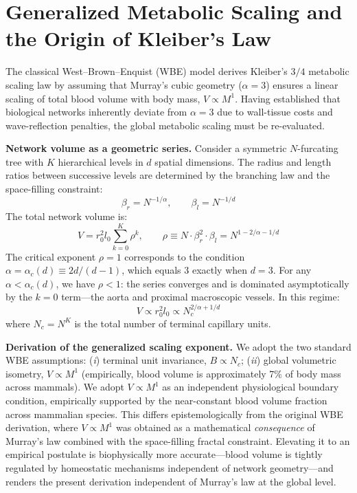 \documentclass[11pt,a4paper]{article}
\theoremstyle{remark}
\begin{document}
\section{Generalized Metabolic Scaling and the Origin of Kleiber's Law}

The classical West--Brown--Enquist (WBE) model derives Kleiber's $3/4$ metabolic
scaling law by assuming that Murray's cubic geometry ($\alpha=3$) ensures a
linear scaling of total blood volume with body mass, $V \propto M^1$. Having
established that biological networks inherently deviate from $\alpha=3$ due to
wall-tissue costs and wave-reflection penalties, the global metabolic scaling
must be re-evaluated.

\noindent\textbf{Network volume as a geometric series.} Consider a symmetric $N$-furcating tree with $K$ hierarchical levels in $d$ spatial dimensions. The radius and length ratios between successive levels are determined by the branching law and the space-filling constraint:
\begin{equation}
\beta_r = N^{-1/\alpha}, \qquad \beta_l = N^{-1/d}
\end{equation}
The total network volume is:
\begin{equation}
V = r_0^2 l_0 \sum_{k=0}^{K} \rho^k, \qquad \rho \equiv N \cdot \beta_r^2 \cdot
\beta_l = N^{1 - 2/\alpha - 1/d}
\end{equation}
The critical exponent $\rho=1$ corresponds to the condition $\alpha =
\alpha_c(d) \equiv 2d/(d-1)$, which equals 3 exactly when $d=3$. For any $\alpha
< \alpha_c(d)$, we have $\rho < 1$: the series converges and is dominated
asymptotically by the $k=0$ term---the aorta and proximal macroscopic vessels.
In this regime:
\begin{equation}
V \propto r_0^2 l_0 \propto N_c^{2/\alpha + 1/d}
\end{equation}
where $N_c = N^K$ is the total number of terminal capillary units.

\noindent\textbf{Derivation of the generalized scaling exponent.} We adopt the two standard WBE assumptions: (\textit{i}) terminal unit invariance, $B \propto N_c$; (\textit{ii}) global volumetric isometry, $V \propto M^1$ (empirically, blood volume is approximately 7\% of body mass across mammals). We adopt $V \propto M^1$ as an independent physiological boundary condition, empirically supported by the near-constant blood volume fraction across mammalian species. This differs epistemologically from the original WBE derivation, where $V \propto M^1$ was obtained as a mathematical \textit{consequence} of Murray's law combined with the space-filling fractal constraint. Elevating it to an empirical postulate is biophysically more accurate---blood volume is tightly regulated by homeostatic mechanisms independent of network geometry---and renders the present derivation independent of Murray's law at the global level.
\end{document}
